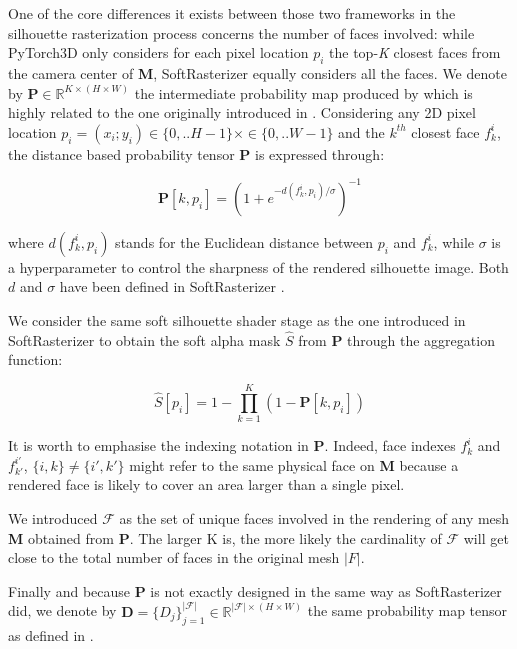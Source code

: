 One of the core differences it exists between those two frameworks in the silhouette rasterization process concerns the number of faces involved: while PyTorch3D only considers for each pixel location $p_i$ the top-\textit{K} closest faces from the camera center of \textbf{M}, SoftRasterizer equally considers all the faces. 
We denote by $\mathbf{P}\in \mathbb{R}^{K\times(H\times W)}$ the intermediate probability map produced by \citep{ravi2020accelarating} which is highly related to the one originally introduced in \citep{liu1029soft}. Considering any 2D pixel location $p_{i}=(x_{i};y_{i}) \in \{0,..H-1\}\times\in \{0,..W-1\} $ and the $k^{th}$ closest face $f_{k}^{i}$, the distance based probability tensor $\mathbf{P}$ is expressed through:

\begin{equation}
    \mathbf{P}[k,p_{i}]=\left(1+e^{-d(f_{k}^{i},p_{i})/\sigma}\right)^{-1} 
\end{equation}

where $d(f_{k}^{i},p_{i})$ stands for the Euclidean distance between $p_i$ and $f_{k}^{i}$, while $\sigma$ is a hyperparameter to control the sharpness of the rendered silhouette image. Both $d$ and $\sigma$ have been defined in SoftRasterizer \citep{liu1029soft}. \newline

We consider the same soft silhouette shader stage as the one introduced in SoftRasterizer to obtain the soft alpha mask $\hat{S}$ from $\mathbf{P}$ through the aggregation function:

\begin{equation}
    \hat{S}[p_i]=1 - \prod_{k=1}^{K} (1 - \mathbf{P}[k,p_{i}])
\end{equation}

It is worth to emphasise the indexing notation in $\mathbf{P}$. Indeed, face indexes $f_{k}^{i}$ and $f_{k'}^{i'}$, $\{i,k\} \neq \{i',k'\}$ might refer to the same physical face on \textbf{M} because a rendered face is likely to cover an area larger than a single pixel. 

We introduced $\mathcal{F}$ as the set of unique faces involved in the rendering of any mesh \textbf{M} obtained from $\mathbf{P}$. The larger K is, the more likely the cardinality of $\mathcal{F}$ will get close to the total number of faces in the original mesh $|F|$. 

Finally and because $\mathbf{P}$ is not exactly designed in the same way as SoftRasterizer did, we denote by $\mathbf{D}=\{D_{j}\}_{j=1}^{|\mathcal{F}|}\in \mathbb{R}^{|\mathcal{F}|\times(H\times W)}$ the same probability map tensor as defined in \citep{liu1029soft}.

